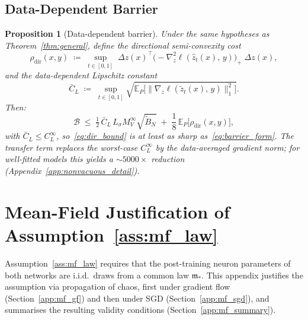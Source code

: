 \documentclass[11pt]{article}
\newtheorem{proposition}[theorem]{Proposition}
\newcommand{\E}{\mathbb{E}}
\newcommand{\cB}{\mathcal{B}}
\begin{document}
\subsection{Data-Dependent Barrier}\label{app:data_dep_barrier}

\begin{proposition}[Data-dependent barrier]\label{prop:dir_barrier}
Under the same hypotheses as Theorem~\ref{thm:general},
define the \emph{directional semi-convexity cost}
\begin{equation}\label{eq:rho_dir}
  \rho_{\mathrm{dir}}(x,y)
  \;\coloneqq\;
  \sup_{t\in[0,1]}\;
  \Delta z(x)^\top
  \bigl(-\nabla^2_z \ell(\hat z_t(x),\,y)\bigr)_{\!+}\;
  \Delta z(x),
\end{equation}
and the \emph{data-dependent Lipschitz constant}
\begin{equation}\label{eq:CL_dd}
  \bar C_L
  \;\coloneqq\;
  \sup_{t\in[0,1]}
  \sqrt{\E_P\!\bigl[\|\nabla_z \ell(\tilde z_t(x),\,y)\|_1^2\bigr]}.
\end{equation}
Then:
\begin{equation}\label{eq:dir_bound}
  \cB \;\le\;
  \tfrac{1}{2}\,\bar C_L\, L_\sigma M_V^\infty \sqrt{\tilde B_N}
  \;+\; \frac{1}{8}\,\E_P\!\bigl[\rho_{\mathrm{dir}}(x,y)\bigr],
\end{equation}
with $\bar C_L \le C_L^\infty$, so~\eqref{eq:dir_bound} is at least
as sharp as~\eqref{eq:barrier_form}.
The transfer term replaces the worst-case $C_L^\infty$ by
the data-averaged gradient norm;
for well-fitted models this yields a $\sim\!5000\times$ reduction
(Appendix~\ref{app:nonvacuous_detail}).
\end{proposition}

\section{Mean-Field Justification of Assumption~\ref{ass:mf_law}}\label{app:A4_mf}

Assumption~\ref{ass:mf_law} requires that the post-training neuron
parameters of both networks are i.i.d.\ draws from a common law
$\mathfrak{m}_*$.
This appendix justifies the assumption via propagation of chaos,
first under gradient flow (Section~\ref{app:mf_gf}) and then under
SGD (Section~\ref{app:mf_sgd}), and summarises the resulting
validity conditions (Section~\ref{app:mf_summary}).
\end{document}
